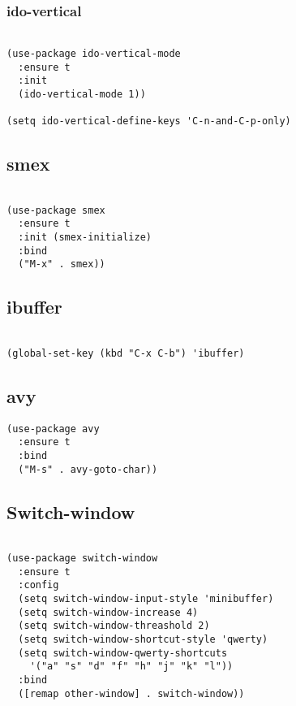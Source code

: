 \documentclass[11pt]{article}
\begin{document}
\subsubsection{ido-vertical}
\label{sec:orgf798dc8}

\begin{verbatim}

(use-package ido-vertical-mode
  :ensure t
  :init
  (ido-vertical-mode 1))

(setq ido-vertical-define-keys 'C-n-and-C-p-only)

\end{verbatim}

\subsection{smex}
\label{sec:org496f03e}

\begin{verbatim}

(use-package smex
  :ensure t
  :init (smex-initialize)
  :bind
  ("M-x" . smex))

\end{verbatim}

\subsection{ibuffer}
\label{sec:orge1b2d55}

\begin{verbatim}

(global-set-key (kbd "C-x C-b") 'ibuffer)

\end{verbatim}

\subsection{avy}
\label{sec:orge69aafe}


\begin{verbatim}
(use-package avy
  :ensure t
  :bind
  ("M-s" . avy-goto-char))
\end{verbatim}
\subsection{Switch-window}
\label{sec:orge44f966}

\begin{verbatim}

(use-package switch-window
  :ensure t
  :config
  (setq switch-window-input-style 'minibuffer)
  (setq switch-window-increase 4)
  (setq switch-window-threashold 2)
  (setq switch-window-shortcut-style 'qwerty)
  (setq switch-window-qwerty-shortcuts
	'("a" "s" "d" "f" "h" "j" "k" "l"))
  :bind
  ([remap other-window] . switch-window))

\end{verbatim}
\end{document}
